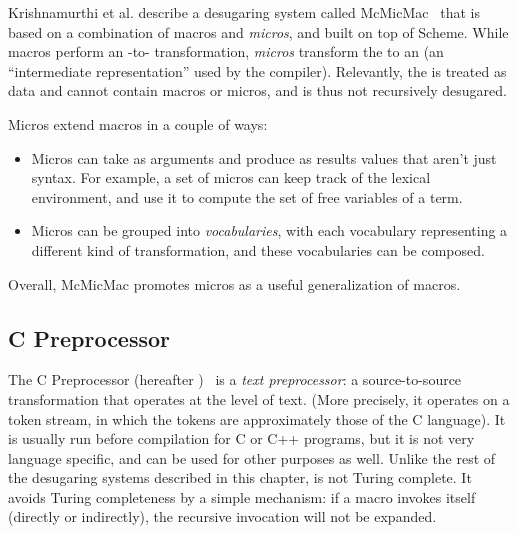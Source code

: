 Krishnamurthi et al. describe a desugaring system called
McMicMac~\cite{sk:mcmicmac} that is based on a combination of macros
and \emph{micros}, and built on top of Scheme. While macros perform an
-to- transformation, \emph{micros} transform the 
to an  (an ``intermediate representation'' used by the compiler).
Relevantly, the  is treated as data and cannot contain macros
or micros, and is thus not recursively desugared.

Micros extend macros in a couple of ways:
\begin{itemize}
  \item Micros can take as arguments and produce as results values
    that aren't just syntax. For example, a set of micros can keep
    track of the lexical environment, and use it to compute the set of
    free variables of a term.
  \item Micros can be grouped into \emph{vocabularies}, with each
    vocabulary representing a different kind of transformation, and
    these vocabularies can be composed.
\end{itemize}
Overall, McMicMac promotes micros as a useful generalization of macros.


\subsection{C Preprocessor} \label{sec:taxonomy-cpre}

The C Preprocessor (hereafter )~\cite{cpp} is a \emph{text
  preprocessor}: a source-to-source transformation that operates at
the level of text. (More precisely, it operates on a token stream, in
which the tokens are approximately those of the C language). It is
usually run before compilation for C or C++ programs, but it is not
very language specific, and can be used for other purposes as well.
Unlike the rest of the desugaring systems described in this chapter,
 is not Turing complete.
It avoids Turing completeness by a simple mechanism: if a macro
invokes itself (directly or indirectly), the recursive invocation
will not be expanded.

